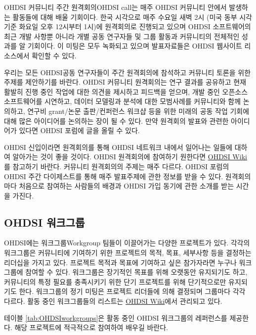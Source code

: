 \documentclass[10.5pt]{book}
\theoremstyle{definition}
\theoremstyle{definition}
\theoremstyle{definition}
\theoremstyle{remark}
\begin{document}
OHDSI 커뮤니티 주간 원격회의OHDSI call는 매주 OHDSI 커뮤니티 안에서
발생하는 활동들에 대해 배울 기회이다. 한국 시각으로 매주 수요일 새벽 2시
(미국 동부 시각 기준 화요일 오후 12시부터 1시)에 원격회의로 진행되고
있으며 OHDSI 소프트웨어의 최근 개발 사항뿐 아니라 개별 공동 연구자들 및
그룹 활동과 커뮤니티의 전체적인 성과를 알 기회이다. 이 미팅은 모두
녹화되고 있으며 발표자료들은 OHDSI 웹사이트 리소스에서 확인할 수 있다.

우리는 모든 OHDSI공동 연구자들이 주간 원격회의에 참석하고 커뮤니티
토론을 위한 주제를 제안하기를 바란다. OHDSI 커뮤니티 원격회의는 연구
결과를 공유하고 현재 활발히 진행 중인 작업에 대한 의견을 제시하고
피드백을 얻으며, 개발 중인 오픈소스 소프트웨어를 시연하고, 데이터
모델링과 분석에 대한 모범사례를 커뮤니티와 함께 논의하고, 연구비
grant/논문 출판/컨퍼런스 워크샵 등을 위한 미래의 공동 작업 기회에 대해
많은 아이디어를 논의하는 장이 될 수 있다. 만약 원격회의 발표와 관련한
아이디어가 있다면 OHDSI 포럼에 글을 올릴 수 있다.

OHDSI 신입이라면 원격회의를 통해 OHDSI 네트워크 내에서 일어나는 일들에
대하여 알아가는 것이 좋을 것이다. OHDSI 원격회의에 참여하기 원한다면
\href{https://www.ohdsi.org/web/wiki/doku.php?id=projects:ohdsi_community}{OHDSI
Wiki}를 참고하기 바란다. 커뮤니티 원격회의의 주제는 매주 다르다. OHDSI
포럼의 OHDSI 주간 다이제스트를 통해 매주 발표주제에 관한 정보를 받을 수
있다. 원격회의마다 처음으로 참여하는 사람들의 배경과 OHDSI 가입 동기에
관한 소개를 받는 시간을 가진다. 

\hypertarget{ohdsi-}{\subsection{OHDSI 워크그룹}\label{ohdsi-}}

OHDSI에는 워크그룹Workgroup 팀들이 이끌어가는 다양한 프로젝트가 있다.
각각의 워크그룹은 커뮤니티에 기여하기 위한 프로젝트의 목적, 목표,
세부사항 등을 결정하는 리더십을 가지고 있다. 프로젝트 목적과 목표에
기여하고 싶은 참가자라면 누구나 워크그룹에 참여할 수 있다. 워크그룹은
장기적인 목표를 위해 오랫동안 유지되기도 하고, 커뮤니티의 특정 필요를
충족시키기 위한 단기 프로젝트를 위해 단기적으로만 유지되기도 한다.
워크그룹의 정기 미팅은 프로젝트 리더들에 의해 결정되며 그룹마다 각각
다르다. 활동 중인 워크그룹들의 리스트는
\href{https://www.ohdsi.org/web/wiki/doku.php?id=projects:overview}{OHDSI
Wiki}에서 관리되고 있다. 

테이블 \ref{tab:OHDSIworkgroups}은 활동 중인 OHDSI 워크그룹의 레퍼런스를
제공한다. 해당 프로젝트에 적극적으로 참여하여 배우길 바란다.
\end{document}
